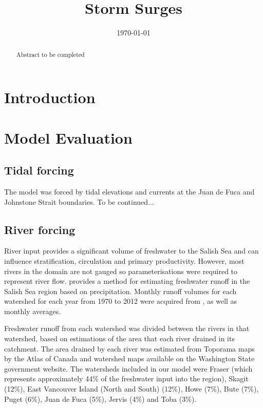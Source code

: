 \documentclass[pdftex,12pt]{article}
\title{Storm Surges}
\date{\today}
\begin{document}
\maketitle

\begin{abstract}
Abstract to be completed
\end{abstract}

\section{Introduction}\label{sec:intro}
\citep{masson2004modelling} %

\section{Model Evaluation}\label{sec:model}

\subsection{Tidal forcing} %
The model was forced by tidal elevations and currents at the Juan de Fuca and Johnstone Strait boundaries. To be continued...

\subsection{River forcing} %
River input provides a significant volume of freshwater to the Salish Sea and can influence stratification, circulation and primary productivity. However, most rivers in the domain are not gauged so parameterisations were required to represent river flow. \cite{morrison2011rivers} provides a method for estimating freshwater runoff in the Salish Sea region based on precipitation. Monthly runoff volumes for each watershed for each year from 1970 to 2012 were acquired from \cite{morrison2011rivers}, as well as monthly averages. 

Freshwater runoff from each watershed was divided between the rivers in that watershed, based on estimations of the area that each river drained in its catchment. The area drained by each river was estimated from Toporama maps by the Atlas of Canada and watershed maps available on the Washington State government website. The watersheds included in our model were Fraser (which represents approximately 44\% of the freshwater input into the region), Skagit (12\%), East Vancouver Island (North and South) (12\%), Howe (7\%), Bute (7\%), Puget (6\%), Juan de Fuca (5\%), Jervis (4\%) and Toba (3\%). 
\end{document}

